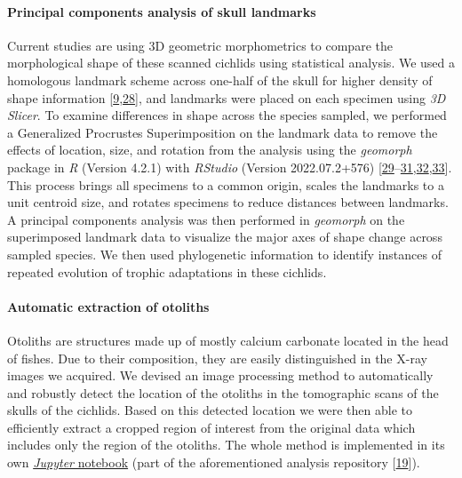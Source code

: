 \hypertarget{principal-components-analysis-of-skull-landmarks}{%
\paragraph{Principal components analysis of skull landmarks}\label{principal-components-analysis-of-skull-landmarks}}

Current studies are using 3D geometric morphometrics to compare the morphological shape of these scanned cichlids using statistical analysis.
We used a homologous landmark scheme across one-half of the skull for higher density of shape information {[}\protect\hyperlink{ref-BDrCSu8p}{9},\protect\hyperlink{ref-15FafMZm5}{28}{]}, and landmarks were placed on each specimen using \emph{3D Slicer}.
To examine differences in shape across the species sampled, we performed a Generalized Procrustes Superimposition on the landmark data to remove the effects of location, size, and rotation from the analysis using the \emph{geomorph} package in \emph{R} (Version 4.2.1) with \emph{RStudio} (Version 2022.07.2+576) {[}\protect\hyperlink{ref-VPUOQA2P}{29}--\protect\hyperlink{ref-EwNL0C0Y}{31},\protect\hyperlink{ref-whEyWyQh}{32},\protect\hyperlink{ref-QfVloFVu}{33}{]}.
This process brings all specimens to a common origin, scales the landmarks to a unit centroid size, and rotates specimens to reduce distances between landmarks.
A principal components analysis was then performed in \emph{geomorph} on the superimposed landmark data to visualize the major axes of shape change across sampled species.
We then used phylogenetic information to identify instances of repeated evolution of trophic adaptations in these cichlids.

\hypertarget{automatic-extraction-of-otoliths}{%
\paragraph{Automatic extraction of otoliths}\label{automatic-extraction-of-otoliths}}

Otoliths are structures made up of mostly calcium carbonate located in the head of fishes.
Due to their composition, they are easily distinguished in the X-ray images we acquired.
We devised an image processing method to automatically and robustly detect the location of the otoliths in the tomographic scans of the skulls of the cichlids.
Based on this detected location we were then able to efficiently extract a cropped region of interest from the original data which includes only the region of the otoliths.
The whole method is implemented in its own \href{https://github.com/habi/EAWAG/blob/master/ExtractOtoliths.ipynb}{\emph{Jupyter} notebook} (part of the aforementioned analysis repository {[}\protect\hyperlink{ref-1HteOscVd}{19}{]}).

